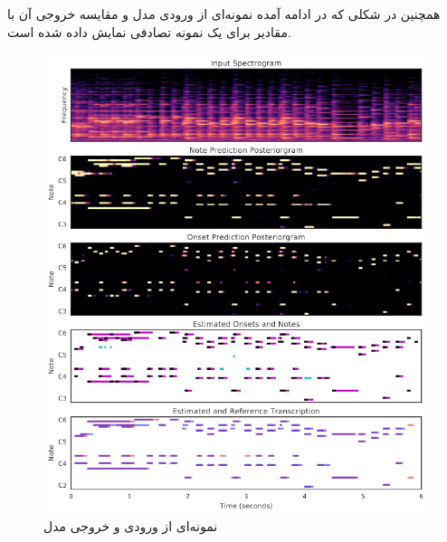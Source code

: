 همچنین در شکلی که در ادامه آمده نمونه‌ای از ورودی مدل و مقایسه خروجی آن با مقادیر
برای یک نمونه تصادفی نمایش داده شده است.

\begin{figure}
    \includegraphics[width=\linewidth]
    {./statics/hawthorne2017onsets_spectorgrams.png}
    \caption{نمونه‌ای از ورودی و خروجی مدل}
\end{figure}